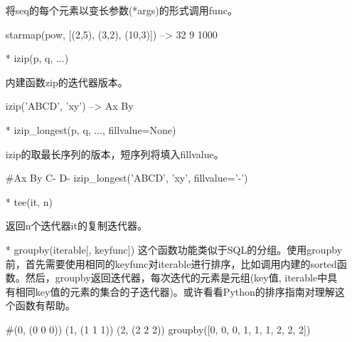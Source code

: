 \documentclass[12pt,a4paper]{report}
\begin{document}
\begin{itemize}
    将seq的每个元素以变长参数(*args)的形式调用func。
        \begin{python}[moreemph={[4]42},caption={},label=ex1]
starmap(pow, [(2,5), (3,2), (10,3)]) --> 32 9 1000
        \end{python}
    \item[*]izip(p, q, ...)

    内建函数zip的迭代器版本。
        \begin{python}[moreemph={[4]42},caption={},label=ex1]
izip('ABCD', 'xy') --> Ax By
        \end{python}
    \item[*]izip\_longest(p, q, ..., fillvalue=None)

    izip的取最长序列的版本，短序列将填入fillvalue。
        \begin{python}[moreemph={[4]42},caption={},label=ex1]
#Ax By C- D-
izip_longest('ABCD', 'xy', fillvalue='-')
        \end{python}
    \item[*]tee(it, n)

    返回n个迭代器it的复制迭代器。
    \item[*]groupby(iterable[, keyfunc])
    这个函数功能类似于SQL的分组。使用groupby前，首先需要使用相同的keyfunc对iterable进行排序，比如调用内建的sorted函数。然后，groupby返回迭代器，每次迭代的元素是元组(key值, iterable中具有相同key值的元素的集合的子迭代器)。或许看看Python的排序指南对理解这个函数有帮助。
        \begin{python}[moreemph={[4]42},caption={},label=ex1]
#(0, (0 0 0)) (1, (1 1 1)) (2, (2 2 2))
groupby([0, 0, 0, 1, 1, 1, 2, 2, 2])
        \end{python}
\end{itemize}
\end{document}
